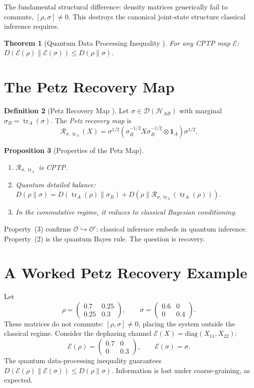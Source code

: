 \documentclass[12pt,oneside]{book}
\theoremstyle{plain}
\newtheorem{theorem}{Theorem}[chapter]
\newtheorem{proposition}[theorem]{Proposition}
\theoremstyle{definition}
\newtheorem{definition}[theorem]{Definition}
\theoremstyle{remark}
\newcommand{\Oold}{\mathcal{O}}
\newcommand{\Onew}{\mathcal{O}'}
\newcommand{\tr}{\operatorname{tr}}
\newcommand{\Hilb}{\mathcal{H}}
\newcommand{\density}{\mathcal{D}}
\begin{document}
The fundamental structural difference: density matrices generically fail
to commute, $[\rho,\sigma] \neq 0$. This destroys the canonical joint-state
structure classical inference requires.

\begin{theorem}[Quantum Data Processing Inequality \cite{wilde2015}]
For any CPTP map $\mathcal{E}$: $D(\mathcal{E}(\rho)\|\mathcal{E}(\sigma))
\leq D(\rho\|\sigma)$.
\end{theorem}

\section{The Petz Recovery Map}

\begin{definition}[Petz Recovery Map \cite{petz1988}]
Let $\sigma \in \density(\Hilb_{AB})$ with marginal $\sigma_B = \tr_A(\sigma)$.
The \emph{Petz recovery map} is
\[
  \mathcal{R}_{\sigma,\tr_A}(X)
  = \sigma^{1/2}(\sigma_B^{-1/2} X \sigma_B^{-1/2} \otimes \mathbf{1}_A)
    \sigma^{1/2}.
\]
\end{definition}

\begin{proposition}[Properties of the Petz Map]
\begin{enumerate}[label=(\arabic*)]
\item $\mathcal{R}_{\sigma,\tr_A}$ is CPTP.
\item Quantum detailed balance:
      $D(\rho\|\sigma) = D(\tr_A(\rho)\|\sigma_B) +
       D(\rho\|\mathcal{R}_{\sigma,\tr_A}(\tr_A(\rho)))$.
\item In the commutative regime, it reduces to classical Bayesian conditioning.
\end{enumerate}
\end{proposition}

Property~(3) confirms $\Oold \hookrightarrow \Onew$: classical inference
embeds in quantum inference. Property~(2) is the quantum Bayes rule.
The question is recovery.

\section{A Worked Petz Recovery Example}

Let
\[
  \rho = \begin{pmatrix} 0.7 & 0.25 \\ 0.25 & 0.3 \end{pmatrix},
  \qquad
  \sigma = \begin{pmatrix} 0.6 & 0 \\ 0 & 0.4 \end{pmatrix}.
\]
These matrices do not commute: $[\rho,\sigma] \neq 0$, placing the system
outside the classical regime. Consider the dephasing channel
$\mathcal{E}(X) = \mathrm{diag}(X_{11}, X_{22})$:
\[
  \mathcal{E}(\rho) = \begin{pmatrix}0.7 & 0 \\ 0 & 0.3\end{pmatrix},
  \qquad \mathcal{E}(\sigma) = \sigma.
\]
The quantum data-processing inequality guarantees
$D(\mathcal{E}(\rho)\|\mathcal{E}(\sigma)) \leq D(\rho\|\sigma)$.
Information is lost under coarse-graining, as expected.
\end{document}

